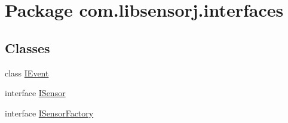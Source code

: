 \hypertarget{namespacecom_1_1libsensorj_1_1interfaces}{}\section{Package com.\+libsensorj.\+interfaces}
\label{namespacecom_1_1libsensorj_1_1interfaces}
\subsection*{Classes}
\begin{DoxyCompactItemize}
\item 
class \hyperlink{classcom_1_1libsensorj_1_1interfaces_1_1IEvent}{I\+Event}
\item 
interface \hyperlink{interfacecom_1_1libsensorj_1_1interfaces_1_1ISensor}{I\+Sensor}
\item 
interface \hyperlink{interfacecom_1_1libsensorj_1_1interfaces_1_1ISensorFactory}{I\+Sensor\+Factory}
\end{DoxyCompactItemize}
